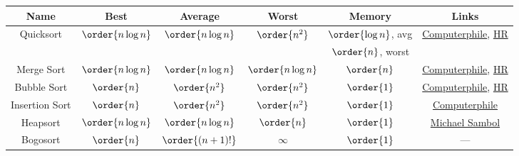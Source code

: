 \begin{tabular}{c c c c c c}
\hline
Name & Best & Average & Worst & Memory & Links \\
\hline
\hline
\multirow{2}{*}{Quicksort} & \multirow{2}{*}{$\order{n \log{n}}$} & \multirow{2}{*}{$\order{n \log{n}}$} & \multirow{2}{*}{$\order{n^{2}}$} & $\order{\log{n}}$, avg & \multirow{2}{*}{\href{https://youtu.be/XE4VP_8Y0BU}{Computerphile}, \href{https://youtu.be/SLauY6PpjW4}{HR}} \\
 & & & & $\order{n}$, worst & \\
Merge Sort & $\order{n \log{n}}$ & $\order{n \log{n}}$ & $\order{n \log{n}}$ & $\order{n}$ & \href{https://youtu.be/kgBjXUE_Nwc}{Computerphile}, \href{https://youtu.be/KF2j-9iSf4Q}{HR} \\
Bubble Sort & $\order{n}$ & $\order{n^{2}}$ & $\order{n^{2}}$ & $\order{1}$ & \href{https://youtu.be/kgBjXUE_Nwc}{Computerphile}, \href{https://youtu.be/6Gv8vg0kcHc}{HR} \\
Insertion Sort & $\order{n}$ & $\order{n^{2}}$ & $\order{n^{2}}$ & $\order{1}$ & \href{https://youtu.be/pcJHkWwjNl4}{Computerphile} \\
Heapsort & $\order{n \log{n}}$ & $\order{n \log{n}}$ & $\order{n}$ & $\order{1}$ & \href{https://youtu.be/2DmK_H7IdTo}{Michael Sambol} \\
Bogosort & $\order{n}$ & $\order{\left(n+1\right)!}$ & $\infty$ & $\order{1}$ & --- \\
\hline
\end{tabular}

